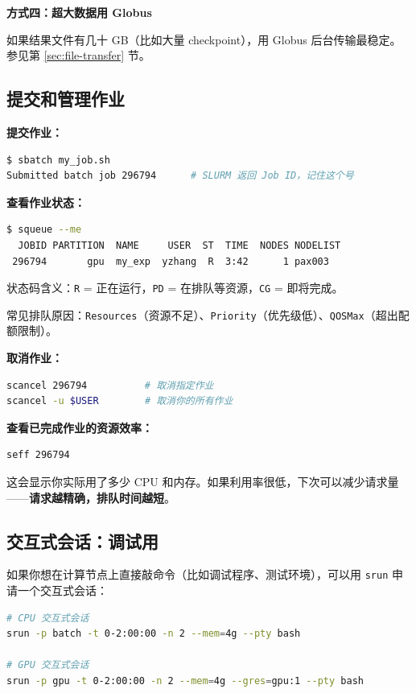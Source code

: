 \textbf{方式四：超大数据用 Globus}

如果结果文件有几十 GB（比如大量 checkpoint），用 Globus 后台传输最稳定。参见第 \ref{sec:file-transfer} 节。

\subsection{提交和管理作业}

\textbf{提交作业：}

\begin{lstlisting}[language=bash]
$ sbatch my_job.sh
Submitted batch job 296794      # SLURM 返回 Job ID，记住这个号
\end{lstlisting}

\textbf{查看作业状态：}

\begin{lstlisting}[language=bash]
$ squeue --me
  JOBID PARTITION  NAME     USER  ST  TIME  NODES NODELIST
 296794       gpu  my_exp  yzhang  R  3:42      1 pax003
\end{lstlisting}

状态码含义：\texttt{R} = 正在运行，\texttt{PD} = 在排队等资源，\texttt{CG} = 即将完成。

常见排队原因：\texttt{Resources}（资源不足）、\texttt{Priority}（优先级低）、\texttt{QOSMax}（超出配额限制）。

\textbf{取消作业：}

\begin{lstlisting}[language=bash]
scancel 296794          # 取消指定作业
scancel -u $USER        # 取消你的所有作业
\end{lstlisting}

\textbf{查看已完成作业的资源效率：}

\begin{lstlisting}[language=bash]
seff 296794
\end{lstlisting}

这会显示你实际用了多少 CPU 和内存。如果利用率很低，下次可以减少请求量——\textbf{请求越精确，排队时间越短}。

\subsection{交互式会话：调试用}

如果你想在计算节点上直接敲命令（比如调试程序、测试环境），可以用 \texttt{srun} 申请一个交互式会话：

\begin{lstlisting}[language=bash]
# CPU 交互式会话
srun -p batch -t 0-2:00:00 -n 2 --mem=4g --pty bash

# GPU 交互式会话
srun -p gpu -t 0-2:00:00 -n 2 --mem=4g --gres=gpu:1 --pty bash
\end{lstlisting}

